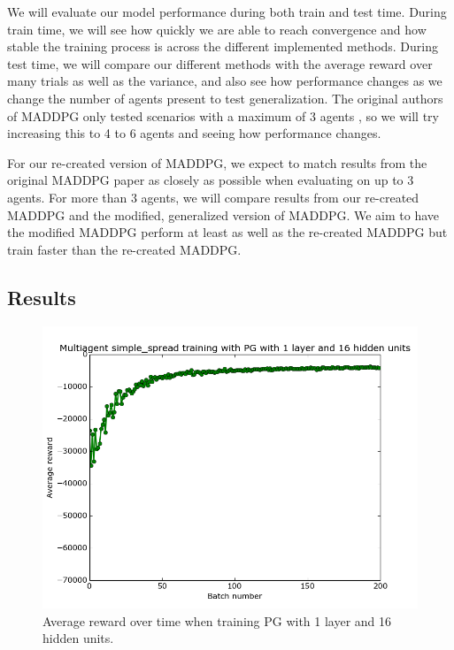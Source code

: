 \documentclass{article}
\begin{document}
We will evaluate our model performance during both train and test time. During train time, we will see how quickly we are able to reach convergence and how stable the training process is across the different implemented methods. During test time, we will compare our different methods with the average reward over many trials as well as the variance, and also see how performance changes as we change the number of agents present to test generalization. The original authors of MADDPG only tested scenarios with a maximum of 3 agents , so we will try increasing this to 4 to 6 agents and seeing how performance changes.

For our re-created version of MADDPG, we expect to match results from the original MADDPG paper as closely as possible when evaluating on up to 3 agents. For more than 3 agents, we will compare results from our re-created MADDPG and the modified, generalized version of MADDPG. We aim to have the modified MADDPG perform at least as well as the re-created MADDPG but train faster than the re-created MADDPG.


\subsection{Results}

\begin{figure}
\centering
    \includegraphics[scale=0.25]{pg_1_16_gamma1}
    \caption{Average reward over time when training PG with 1 layer and 16 hidden units.}
\label{fig:pg_1_16_gamma1}
\end{figure}
\end{document}
